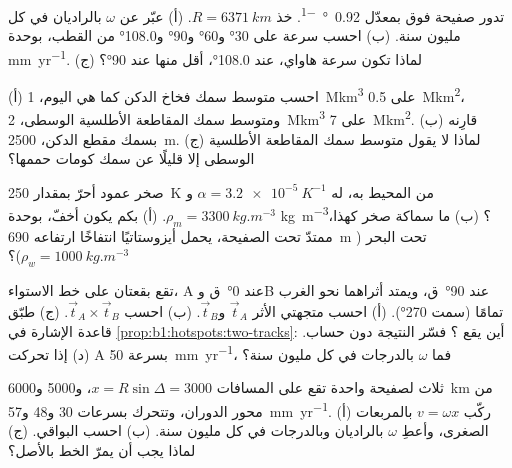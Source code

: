 \begin{exercise}[$\star$]\label{exo:b1:hotspots:2}
تدور صفيحة فوق  بمعدّل \qty{0.92}{\degree\per\Myr}. خذ $R = \qty{6371}{km}$. (أ) عبّر عن $\omega$ بالراديان في كل مليون سنة. (ب) احسب سرعة  على \ang{30} و\ang{60} و\ang{90} و\ang{108.0} من القطب، بوحدة \unit{mm.yr^{-1}}. (ج) لماذا تكون سرعة هاواي، عند \ang{108.0}، أقل منها عند \ang{90}؟
\end{exercise}

\begin{exercise}[$\star$]\label{exo:b1:hotspots:3}
(أ) احسب متوسط سمك فخاخ الدكن كما هي اليوم، \qty{1}{\mega km^3} على \qty{0.5}{\mega km^2}، ومتوسط سمك المقاطعة الأطلسية الوسطى، \qty{2}{\mega km^3} على \qty{7}{\mega km^2}. (ب) قارِنه بسمك مقطع الدكن، \qty{2500}{m}. (ج) لماذا لا يقول متوسط سمك المقاطعة الأطلسية الوسطى إلا قليلًا عن سمك كومات حممها؟
\end{exercise}

\begin{exercise}[$\star$]\label{exo:b1:hotspots:4}
صخر عمود أحرّ بمقدار \qty{250}{K} من  المحيط به، له $\alpha = \qty{3.2e-5}{K^{-1}}$ و$\rho_m = \qty{3300}{kg.m^{-3}}$. (أ) بكم يكون أخفّ، بوحدة \unit{kg.m^{-3}}؟ (ب) ما سماكة صخر كهذا، ممتدّ تحت الصفيحة، يحمل أيزوستاتيًا انتفاخًا ارتفاعه \qty{690}{m} تحت البحر ($\rho_w = \qty{1000}{kg.m^{-3}}$)؟
\end{exercise}

\begin{exercise}[$\star\star$]\label{exo:b1:hotspots:5}
تقع بقعتان على خط الاستواء، A عند \ang{0}~ق وB عند \ang{90}~ق، ويمتد أثراهما نحو الغرب تمامًا (سمت \ang{270}). (أ) احسب متجهتي الأثر $\vec t_A$ و$\vec t_B$. (ب) احسب $\vec t_A\times\vec t_B$. (ج) طبّق قاعدة الإشارة في \cref{prop:b1:hotspots:two-tracks}: أين يقع ؟ فسّر النتيجة دون حساب. (د) إذا تحركت A بسرعة \qty{50}{mm.yr^{-1}}، فما $\omega$ بالدرجات في كل مليون سنة؟
\end{exercise}

\begin{exercise}[$\star\star$]\label{exo:b1:hotspots:6}
ثلاث  لصفيحة واحدة تقع على المسافات $x = R\sin\Delta = 3000$، و\num{5000} و\qty{6000}{km} من محور الدوران، وتتحرك بسرعات 30 و\num{48} و\qty{57}{mm.yr^{-1}}. (أ) ركّب $v = \omega x$ بالمربعات الصغرى، وأعطِ $\omega$ بالراديان وبالدرجات في كل مليون سنة. (ب) احسب البواقي. (ج) لماذا يجب أن يمرّ الخط بالأصل؟
\end{exercise}

